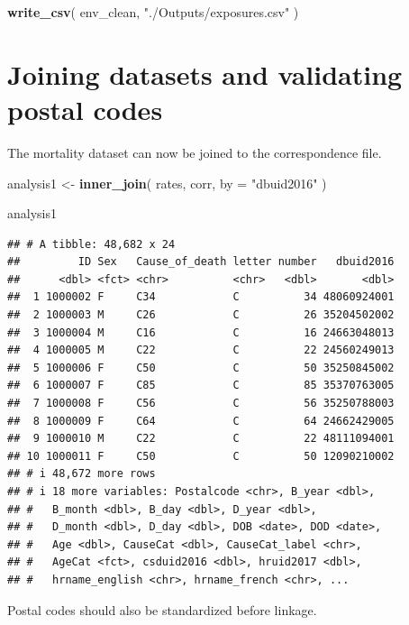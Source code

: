 \documentclass[
  11pt,
  oneside]{book}
\newenvironment{Shaded}{\begin{snugshade}}{\end{snugshade}}
\newcommand{\AttributeTok}[1]{\textcolor[rgb]{0.13,0.29,0.53}{#1}}
\newcommand{\FunctionTok}[1]{\textcolor[rgb]{0.13,0.29,0.53}{\textbf{#1}}}
\newcommand{\NormalTok}[1]{#1}
\newcommand{\OtherTok}[1]{\textcolor[rgb]{0.56,0.35,0.01}{#1}}
\newcommand{\StringTok}[1]{\textcolor[rgb]{0.31,0.60,0.02}{#1}}
\begin{document}
\begin{Shaded}
\begin{Highlighting}[]
\FunctionTok{write\_csv}\NormalTok{(}
\NormalTok{  env\_clean,}
  \StringTok{"./Outputs/exposures.csv"}
\NormalTok{)}
\end{Highlighting}
\end{Shaded}

\section{Joining datasets and validating postal codes}\label{joining-datasets-and-validating-postal-codes}

The mortality dataset can now be joined to the correspondence file.

\begin{Shaded}
\begin{Highlighting}[]
\NormalTok{analysis1 }\OtherTok{\textless{}{-}} \FunctionTok{inner\_join}\NormalTok{(}
\NormalTok{  rates,}
\NormalTok{  corr,}
  \AttributeTok{by =} \StringTok{"dbuid2016"}
\NormalTok{)}

\NormalTok{analysis1}
\end{Highlighting}
\end{Shaded}

\begin{verbatim}
## # A tibble: 48,682 x 24
##         ID Sex   Cause_of_death letter number   dbuid2016
##      <dbl> <fct> <chr>          <chr>   <dbl>       <dbl>
##  1 1000002 F     C34            C          34 48060924001
##  2 1000003 M     C26            C          26 35204502002
##  3 1000004 M     C16            C          16 24663048013
##  4 1000005 M     C22            C          22 24560249013
##  5 1000006 F     C50            C          50 35250845002
##  6 1000007 F     C85            C          85 35370763005
##  7 1000008 F     C56            C          56 35250788003
##  8 1000009 F     C64            C          64 24662429005
##  9 1000010 M     C22            C          22 48111094001
## 10 1000011 F     C50            C          50 12090210002
## # i 48,672 more rows
## # i 18 more variables: Postalcode <chr>, B_year <dbl>,
## #   B_month <dbl>, B_day <dbl>, D_year <dbl>,
## #   D_month <dbl>, D_day <dbl>, DOB <date>, DOD <date>,
## #   Age <dbl>, CauseCat <dbl>, CauseCat_label <chr>,
## #   AgeCat <fct>, csduid2016 <dbl>, hruid2017 <dbl>,
## #   hrname_english <chr>, hrname_french <chr>, ...
\end{verbatim}

Postal codes should also be standardized before linkage.
\end{document}
